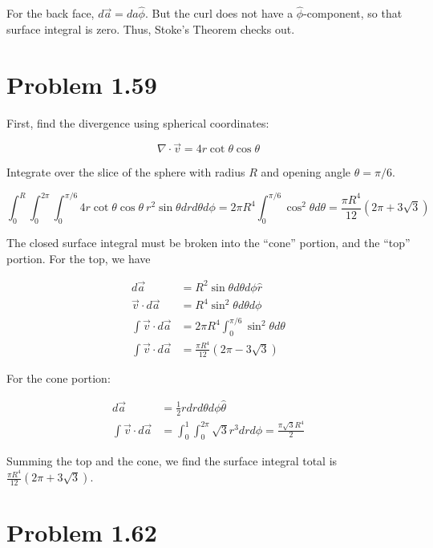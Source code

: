 \documentclass[10pt]{article}
\begin{document}
For the back face, $d\vec{a} = da \hat{\phi}$.  But the curl does not have a $\hat{\phi}$-component, so that surface integral is zero. Thus, Stoke's Theorem checks out.

\section{Problem 1.59}

First, find the divergence using spherical coordinates:

\begin{equation}
\nabla \cdot \vec{v} = 4 r \cot\theta\cos\theta
\end{equation}

Integrate over the slice of the sphere with radius $R$ and opening angle $\theta = \pi/6$.

\begin{equation}
\int_0^{R} \int_0^{2\pi} \int_0^{\pi/6} 4 r \cot\theta\cos\theta ~ r^2 \sin\theta dr d\theta d\phi = 2\pi R^4 \int_0^{\pi/6} \cos^2\theta d\theta = \boxed{\frac{\pi R^4}{12}(2\pi + 3\sqrt{3})}
\end{equation}

The closed surface integral must be broken into the ``cone'' portion, and the ``top'' portion.  For the top, we have

\begin{align}
d\vec{a} &= R^2 \sin\theta d\theta d\phi \hat{r} \\
\vec{v} \cdot d\vec{a} &= R^4 \sin^2\theta d\theta d\phi \\
\int \vec{v} \cdot d\vec{a} &= 2\pi R^4 \int_{0}^{\pi/6} \sin^2\theta d\theta \\
\int \vec{v} \cdot d\vec{a} &= \frac{\pi R^4}{12}(2\pi - 3\sqrt{3})
\end{align}

For the cone portion:

\begin{align}
d\vec{a} &= \frac{1}{2} r dr d\theta d\phi \hat{\theta} \\
\int \vec{v} \cdot d\vec{a} &= \int_0^{1} \int_{0}^{2\pi} \sqrt{3} r^3 dr d\phi = \frac{\pi \sqrt{3} R^4}{2} 
\end{align}

Summing the top and the cone, we find the surface integral total is $\boxed{\frac{\pi R^4}{12}(2\pi + 3\sqrt{3})}$.

\section{Problem 1.62}
\end{document}
